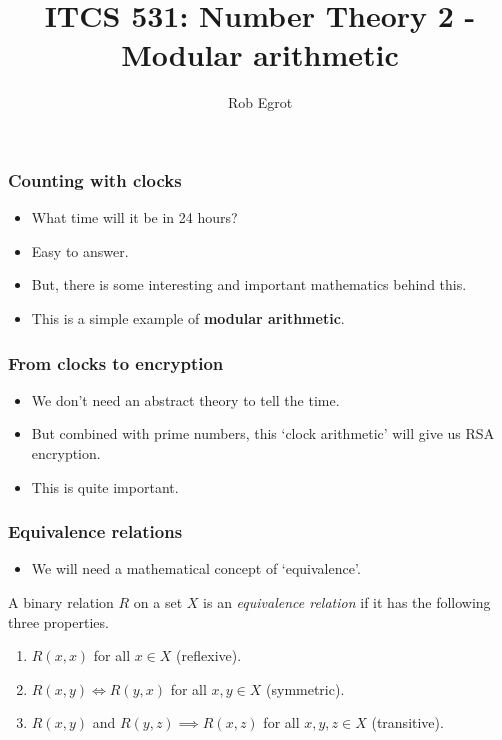 \documentclass[handout]{beamer}
\title{ITCS 531: Number Theory 2 - Modular arithmetic}
\date{}
\author{Rob Egrot}
\begin{document}
\begin{frame}
\titlepage
\end{frame}

\begin{frame}
\frametitle{Counting with clocks}
\begin{itemize}
\item What time will it be in 24 hours? 
\vspace{0.5cm}
\item Easy to answer. 
\vspace{0.5cm}
\item But, there is some interesting and important mathematics behind this. 
\vspace{0.5cm}
\item This is a simple example of \textbf{modular arithmetic}. 
\end{itemize}
\end{frame}

\begin{frame}
\frametitle{From clocks to encryption}
\begin{itemize}
\item We don't need an abstract theory to tell the time. 
\vspace{0.5cm}
\item But combined with prime numbers, this `clock arithmetic' will give us RSA encryption.
\vspace{0.5cm}
\item This is quite important.
\end{itemize}
\end{frame}

\begin{frame}
\frametitle{Equivalence relations}
\begin{itemize}
\item We will need a mathematical concept of `equivalence'.
\end{itemize}
\begin{definition}\label{D:equiv}
A binary relation $R$ on a set $X$ is an \emph{equivalence relation} if it has the following three properties.
\begin{enumerate}
\item $R(x,x)$ for all $x\in X$ (reflexive).  
\item $R(x,y)\iff R(y,x)$ for all $x,y\in X$ (symmetric).
\item $R(x,y)$ and $R(y,z)\implies R(x,z)$ for all $x,y,z\in X$ (transitive).
\end{enumerate}
\end{definition}
\end{frame}
\end{document}
